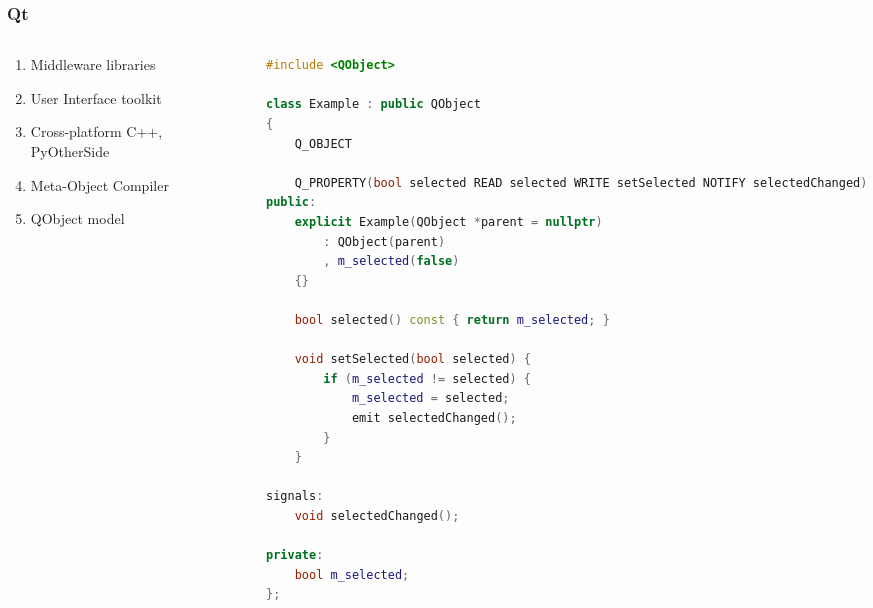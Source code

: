 \documentclass[
	notes=none,
	aspectratio=169
]{beamer}
\begin{document}
\begin{frame}[fragile]
\frametitle{Qt}

\begin{columns}[T]
\begin{column}[T]{0.5\textwidth}
\setlength{\parskip}{0.5em}

\vspace{1.0cm}
\begin{enumerate}
\setlength{\parskip}{0.5em}
\item Middleware libraries
\item User Interface toolkit
\item Cross-platform C++, PyOtherSide
\item Meta-Object Compiler
\item QObject model
\end{enumerate}

\end{column}
\begin{column}[T]{0.5\textwidth}

\begin{lstlisting}[language=cpp]
#include <QObject>

class Example : public QObject
{
    Q_OBJECT

    Q_PROPERTY(bool selected READ selected WRITE setSelected NOTIFY selectedChanged)
public:
    explicit Example(QObject *parent = nullptr)
        : QObject(parent)
        , m_selected(false)
    {}

    bool selected() const { return m_selected; }

    void setSelected(bool selected) {
        if (m_selected != selected) {
            m_selected = selected;
            emit selectedChanged();
        }
    }

signals:
    void selectedChanged();

private:
    bool m_selected;
};
\end{lstlisting}
\end{column}
\end{columns}

\end{frame}
\note{
}

\end{document}
